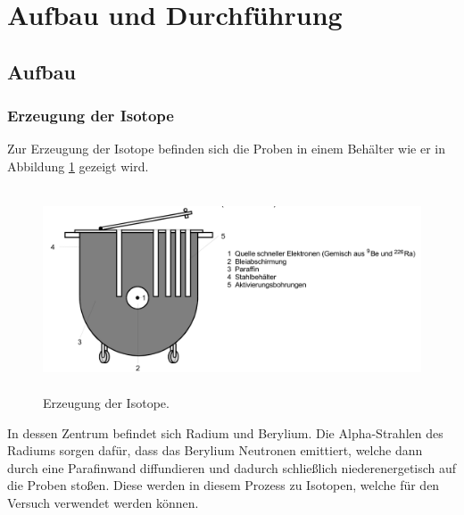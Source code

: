 \section{Aufbau und Durchführung}
\subsection{Aufbau}
\label{sec:Aufbau}
\subsubsection{Erzeugung der Isotope}
Zur Erzeugung der Isotope befinden sich die Proben in einem Behälter wie er in Abbildung \ref{abb:1} gezeigt wird.
\begin{figure}[H]
  \centering
  \includegraphics[height=6cm]{ressources/erzeugung.png}
  \caption{Erzeugung der Isotope. \cite{skript}}
  \label{abb:1}
\end{figure}
In dessen Zentrum befindet sich Radium und Berylium.
Die Alpha-Strahlen des Radiums sorgen dafür, dass das Berylium Neutronen emittiert, welche dann durch eine Parafinwand diffundieren und dadurch schließlich niederenergetisch auf die Proben stoßen.
Diese werden in diesem Prozess zu Isotopen, welche für den Versuch verwendet werden können.


